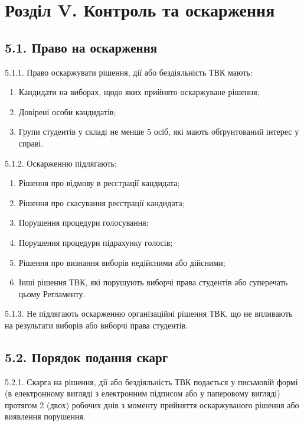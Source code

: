 \section*{Розділ V. Контроль та оскарження}

\subsection*{5.1. Право на оскарження}
    5.1.1. Право оскаржувати рішення, дії або бездіяльність ТВК мають:

        \begin{enumerate}[label=\alph*)]
            \item Кандидати на виборах, щодо яких прийнято оскаржуване рішення;
            \item Довірені особи кандидатів;
            \item Групи студентів у складі не менше 5 осіб, які мають обґрунтований інтерес у справі.
        \end{enumerate}

    5.1.2. Оскарженню підлягають:

        \begin{enumerate}[label=\alph*)]
            \item Рішення про відмову в реєстрації кандидата;
            \item Рішення про скасування реєстрації кандидата;
            \item Порушення процедури голосування;
            \item Порушення процедури підрахунку голосів;
            \item Рішення про визнання виборів недійсними або дійсними;
            \item Інші рішення ТВК, які порушують виборчі права студентів або суперечать цьому Регламенту.
        \end{enumerate}

    5.1.3. Не підлягають оскарженню організаційні рішення ТВК, що не впливають на результати виборів або виборчі права студентів.

\subsection*{5.2. Порядок подання скарг}
    5.2.1. Скарга на рішення, дії або бездіяльність ТВК подається у письмовій формі (в електронному вигляді з електронним підписом або у паперовому вигляді) протягом 2 (двох) робочих днів з моменту прийняття оскаржуваного рішення або виявлення порушення.

